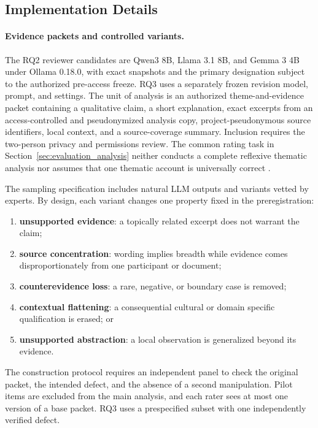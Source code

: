 \subsection{Implementation Details}

\paragraph{Evidence packets and controlled variants.}

The RQ2 reviewer candidates are Qwen3 8B, Llama 3.1 8B, and Gemma 3 4B under Ollama 0.18.0, with exact snapshots and the primary designation subject to the authorized pre-access freeze. RQ3 uses a separately frozen revision model, prompt, and settings. The unit of analysis is an authorized theme-and-evidence packet containing a qualitative claim, a short explanation, exact excerpts from an access-controlled and pseudonymized analysis copy, project-pseudonymous source identifiers, local context, and a source-coverage summary. Inclusion requires the two-person privacy and permissions review. The common rating task in Section~\ref{sec:evaluation_analysis} neither conducts a complete reflexive thematic analysis nor assumes that one thematic account is universally correct \citep{braun2021can,braun2021quality}.

The sampling specification includes natural LLM outputs and variants vetted by experts. By design, each variant changes one property fixed in the preregistration:

\begin{enumerate}
    \item \textbf{unsupported evidence}: a topically related excerpt does not warrant the claim;
    \item \textbf{source concentration}: wording implies breadth while evidence comes disproportionately from one participant or document;
    \item \textbf{counterevidence loss}: a rare, negative, or boundary case is removed;
    \item \textbf{contextual flattening}: a consequential cultural or domain specific qualification is erased; or
    \item \textbf{unsupported abstraction}: a local observation is generalized beyond its evidence.
\end{enumerate}

The construction protocol requires an independent panel to check the original packet, the intended defect, and the absence of a second manipulation. Pilot items are excluded from the main analysis, and each rater sees at most one version of a base packet. RQ3 uses a prespecified subset with one independently verified defect.

